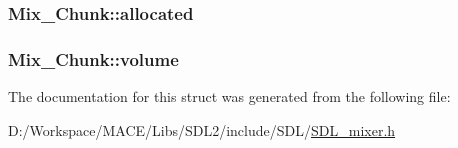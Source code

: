 \subsubsection[{\texorpdfstring{allocated}{allocated}}]{ Mix\+\_\+\+Chunk\+::allocated}\hypertarget{struct_mix___chunk_a7b985b90b5f97fffe34834116a281615}{}\label{struct_mix___chunk_a7b985b90b5f97fffe34834116a281615}
\subsubsection[{\texorpdfstring{volume}{volume}}]{ Mix\+\_\+\+Chunk\+::volume}\hypertarget{struct_mix___chunk_afc566fd5da7f0ed1f3577f5bc0eac319}{}\label{struct_mix___chunk_afc566fd5da7f0ed1f3577f5bc0eac319}


The documentation for this struct was generated from the following file\+:\begin{DoxyCompactItemize}
\item 
D\+:/\+Workspace/\+M\+A\+C\+E/\+Libs/\+S\+D\+L2/include/\+S\+D\+L/\hyperlink{_s_d_l__mixer_8h}{S\+D\+L\+\_\+mixer.\+h}\end{DoxyCompactItemize}
